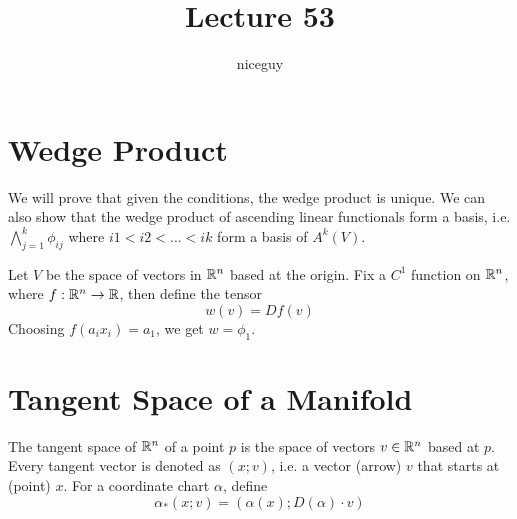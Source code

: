 \documentclass[12pt]{article}
\title{Lecture 53}
\author{niceguy}
\begin{document}
\maketitle

\section{Wedge Product}

We will prove that given the conditions, the wedge product is unique. We can also show that the wedge product of ascending linear functionals form a basis, i.e.
$\bigwedge_{j=1}^k \phi_{ij}$ where $i1 < i2 < \dots < ik$ form a basis of $A^k(V)$.

\begin{ex}
    Let $V$ be the space of vectors in $\mathbb{R}^n$ based at the origin. Fix a $C^1$ function on $\mathbb{R}^n$, where $f:\mathbb{R}^n \rightarrow \mathbb{R}$, then define the tensor
    $$w(v) = Df(v)$$
    Choosing $f(a_ix_i) = a_1$, we get $w = \phi_1$.
\end{ex}

\section{Tangent Space of a Manifold}

The tangent space of $\mathbb{R}^n$ of a point $p$ is the space of vectors $v \in \mathbb{R}^n$ based at $p$. Every tangent vector is denoted as $(x;v)$, i.e. a vector (arrow) $v$ that starts at (point) $x$. For a coordinate chart $\alpha$, define
$$\alpha_*(x;v) = (\alpha(x);D(\alpha) \cdot v)$$
\end{document}
